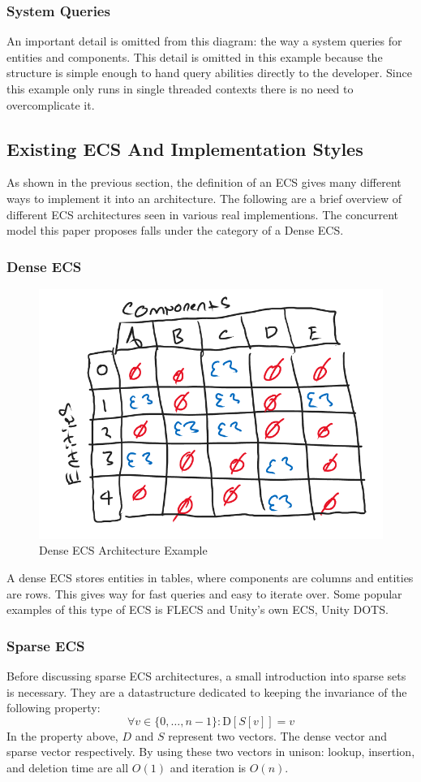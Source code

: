 \subsubsection{System Queries}
An important detail is omitted from this diagram: the way a system queries for entities and components. This detail is omitted in this example because the structure is simple enough to hand query abilities directly to the developer. Since this example only runs in single threaded contexts there is no need to overcomplicate it.

\subsection{Existing ECS And Implementation Styles}
As shown in the previous section, the definition of an ECS gives many different ways to implement it into an architecture. The following are a brief overview of different ECS architectures seen in various real implementions. The concurrent model this paper proposes falls under the category of a Dense ECS.  

\subsubsection{Dense ECS}
\begin{figure}[htbp]
    \centering
    \includegraphics[width=0.5\linewidth]{resources/dense_ecs.png}
    \caption{Dense ECS Architecture Example}
    \label{fig:dense_ecs}
\end{figure}

A dense ECS stores entities in tables, where components are columns and entities are rows. This gives way for fast queries and easy to iterate over. Some popular examples of this type of ECS is FLECS and Unity's own ECS, Unity DOTS.

\subsubsection{Sparse ECS}
Before discussing sparse ECS architectures, a small introduction into sparse sets is necessary. They are a datastructure dedicated to keeping the invariance of the following property:
\begin{equation*}
    \forall v \in \{0,\ldots, n-1\} : \text{D}[S[v]] = v
\end{equation*}
In the property above, $D$ and $S$ represent two vectors. The dense vector and sparse vector respectively. By using these two vectors in unison: lookup, insertion, and deletion time are all $O(1)$ and iteration is $O(n)$. 

